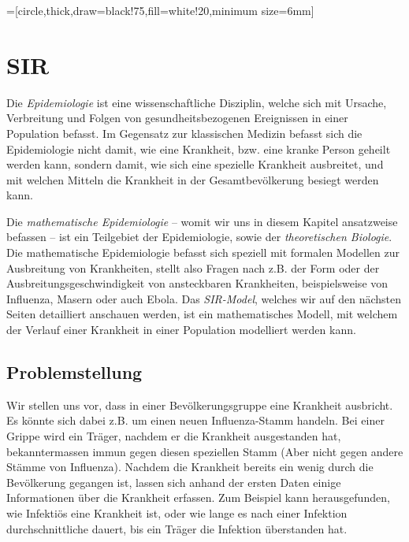 \usetikzlibrary{arrows,shapes,snakes,automata,backgrounds,petri}
=[circle,thick,draw=black!75,fill=white!20,minimum size=6mm]

\chapter{SIR\label{chapter:sir}}
\begin{refsection}

Die \emph{Epidemiologie} ist eine wissenschaftliche Disziplin, welche sich mit Ursache, Verbreitung und Folgen von gesundheitsbezogenen Ereignissen in einer Population befasst.
Im Gegensatz zur klassischen Medizin befasst sich die Epidemiologie nicht damit, wie eine Krankheit, bzw. eine kranke Person geheilt werden kann, sondern damit, wie sich eine spezielle Krankheit ausbreitet, und mit welchen Mitteln die Krankheit in der Gesamtbevölkerung besiegt werden kann.

Die \emph{mathematische Epidemiologie} -- womit wir uns in diesem Kapitel ansatzweise befassen -- ist ein Teilgebiet der Epidemiologie, sowie der \emph{theoretischen Biologie}.
Die mathematische Epidemiologie befasst sich speziell mit formalen Modellen zur Ausbreitung von Krankheiten, stellt also Fragen nach z.B. der Form oder der Ausbreitungsgeschwindigkeit von ansteckbaren Krankheiten, beispielsweise von Influenza, Masern oder auch Ebola. 
Das \emph{SIR-Model}, welches wir auf den nächsten Seiten detailliert anschauen werden, ist ein mathematisches Modell, mit welchem der Verlauf einer Krankheit in einer Population modelliert werden kann.

\section{Problemstellung}
Wir stellen uns vor, dass in einer Bevölkerungsgruppe eine Krankheit ausbricht. 
Es könnte sich dabei z.B. um einen neuen Influenza-Stamm handeln.
Bei einer Grippe wird ein Träger, nachdem er die Krankheit ausgestanden hat, bekanntermassen immun gegen diesen speziellen Stamm (Aber nicht gegen andere Stämme von Influenza).
Nachdem die Krankheit bereits ein wenig durch die Bevölkerung gegangen ist, lassen sich anhand der ersten Daten einige Informationen über die Krankheit erfassen.
Zum Beispiel kann herausgefunden, wie Infektiös eine Krankheit ist, oder wie lange es nach einer Infektion durchschnittliche dauert, bis ein Träger die Infektion überstanden hat.


\end{refsection}
